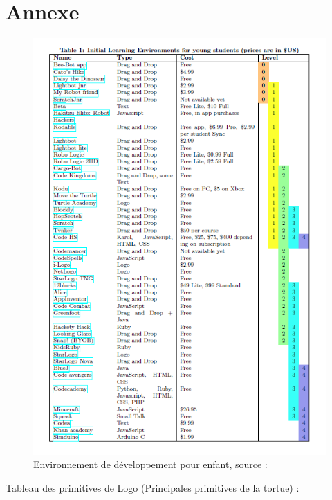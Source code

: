 \chapter{Annexe}


\begin{figure}[!htb]
  \centering
  \includegraphics[width=150mm,scale=0.5]{initial_structure_env.PNG}
  \caption{Environnement de développement pour enfant, source : \cite{1}}
  \label{fig:boat1}
\end{figure}

\newpage

Tableau des primitives de Logo (Principales primitives de la tortue) :


